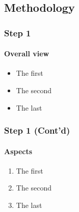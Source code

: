 \documentclass[11pt]{beamer}
\begin{document}
\subsection{Methodology}
\begin{frame}
\frametitle{Step 1}
\framesubtitle{Overall view}
	\begin{itemize}
		\item<1->The first
		\item<2->The second
		\item<3->The last
	\end{itemize}
\end{frame}
\begin{frame}
\frametitle{Step 1 (Cont'd)}
\framesubtitle{Aspects}
\begin{enumerate}
	\item<1->The first
	\item<2->The second
	\item<3->The last
\end{enumerate}
\end{frame}
\end{document}
